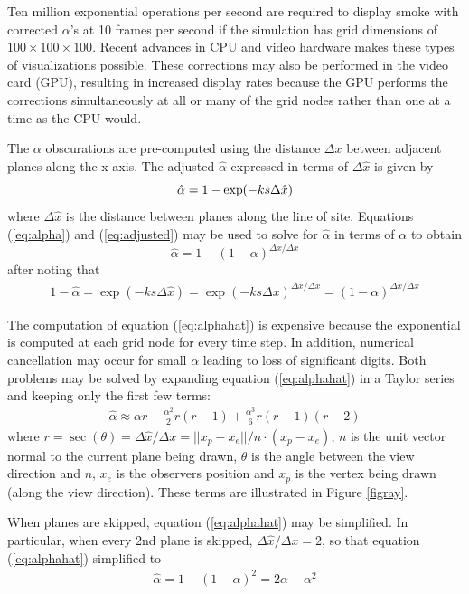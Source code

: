 \documentclass[11pt,twoside]{book}
\begin{document}
Ten million exponential operations per second are required to
display smoke with corrected $\alpha$'s at 10 frames per second if
the simulation has grid dimensions of $100\times 100\times 100$.
Recent advances in CPU and video hardware makes these types of
visualizations possible. These corrections may also be performed
in the video card (GPU), resulting in increased display rates
because the GPU performs the corrections simultaneously at all or
many of the grid nodes rather than one at a time as the CPU would.

The $\alpha$ obscurations are pre-computed using the distance
$\Delta x$ between adjacent planes along the x-axis. The adjusted
$\hat{\alpha}$ expressed in terms of $\Delta\hat{x}$ is given by
\begin{equation}
\label{eq:adjusted}
\hat{\alpha}=1-\exp(-ks\Delta \hat{x})\\
\end{equation}
where $\Delta\hat{x}$ is the distance between planes along the line of site.
Equations (\ref{eq:alpha}) and (\ref{eq:adjusted}) may be used to
solve for $\hat{\alpha}$ in terms of $\alpha$ to obtain
\begin{equation}
\label{eq:alphahat}
\hat{\alpha}=1-(1-\alpha)^{\Delta\hat{x}/\Delta x}
\end{equation}
after noting that
\begin{eqnarray*}
1-\hat{\alpha}=\exp(-ks\Delta\hat{x})=\exp(-ks\Delta
x)^{\Delta\hat{x}/\Delta x}=(1-\alpha)^{\Delta\hat{x}/\Delta x}
\end{eqnarray*}

The computation of equation (\ref{eq:alphahat}) is expensive
because the exponential is computed at each grid node for every
time step.  In addition, numerical cancellation may occur for
small $\alpha$ leading to loss of significant digits. Both
problems may be solved by expanding equation (\ref{eq:alphahat})
in a Taylor series and keeping only the first few terms:
\begin{eqnarray*}
\hat{\alpha}\approx \alpha r -
\frac{\alpha^2}{2}r(r-1)+\frac{\alpha^3}{6}r(r-1)(r-2)
\end{eqnarray*}
where $r=\sec(\theta)=\Delta \hat{x}/\Delta
x=||x_p-x_e||/n\cdot(x_p-x_e)$, $n$ is the unit vector normal to
the current plane being drawn, $\theta$ is the angle between the
view direction and $n$, $x_e$ is the observers position and $x_p$
is the vertex being drawn (along the view direction).  These terms
are illustrated in Figure \ref{figray}.

When planes are skipped, equation (\ref{eq:alphahat}) may be simplified.  In particular,
when every 2nd plane is
skipped, $\Delta\hat{x}/\Delta x=2$, so that equation (\ref{eq:alphahat}) simplified to
\begin{eqnarray*}
\hat{\alpha}=1-(1-\alpha)^2=2\alpha-\alpha^2
\end{eqnarray*}
\end{document}

